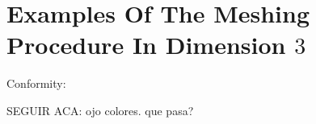 \section{Examples Of The Meshing Procedure In Dimension $3$} %
\label{sec:examples_of_the_meshing_procedure}



\tauZero
{}
\tauOneEnCube
\tauOneEn
Conformity:
\conform



SEGUIR ACA: ojo colores. que pasa?



